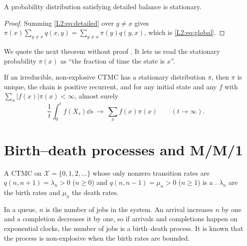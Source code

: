 \begin{lemma}\label{L2:lem:detailed}
A probability distribution satisfying detailed balance is stationary.
\end{lemma}
\begin{proof}
Summing \eqref{L2:eq:detailed} over $y\ne x$ gives $\pi(x)\sum_{y\ne x}q(x,y)=\sum_{y\ne x}\pi(y)q(y,x)$, which is \eqref{L2:eq:global}.
\end{proof}

We quote the next theorem without proof \cite[Ch.~3]{norris1997}. It lets us read the
stationary probability $\pi(x)$ as ``the fraction of time the state is $x$''.

\begin{theorem}\label{L2:thm:ergodic}
If an irreducible, non-explosive CTMC has a stationary distribution $\pi$, then $\pi$
is unique, the chain is positive recurrent, and for any initial state and any $f$ with
$\sum_x|f(x)|\pi(x)<\infty$, almost surely
\[
  \frac1t\int_0^t f(X_s)\dd s\ \longrightarrow\ \sum_x f(x)\pi(x)\qquad(t\to\infty).
\]
\end{theorem}

\section{Birth--death processes and M/M/1}

\begin{definition}\label{L2:def:bd}
A CTMC on $\mathcal{X}=\{0,1,2,\dots\}$ whose only nonzero transition rates are
$q(n,n+1)=\lambda_n>0$ ($n\ge0$) and $q(n,n-1)=\mu_n>0$ ($n\ge1$) is a
. $\lambda_n$ are the birth rates and $\mu_n$ the death
rates.
\end{definition}

In a queue, $n$ is the number of jobs in the system. An arrival increases $n$ by one
and a completion decreases it by one, so if arrivals and completions happen on
exponential clocks, the number of jobs is a birth--death process. It is known that
the process is non-explosive when the birth rates are bounded.

